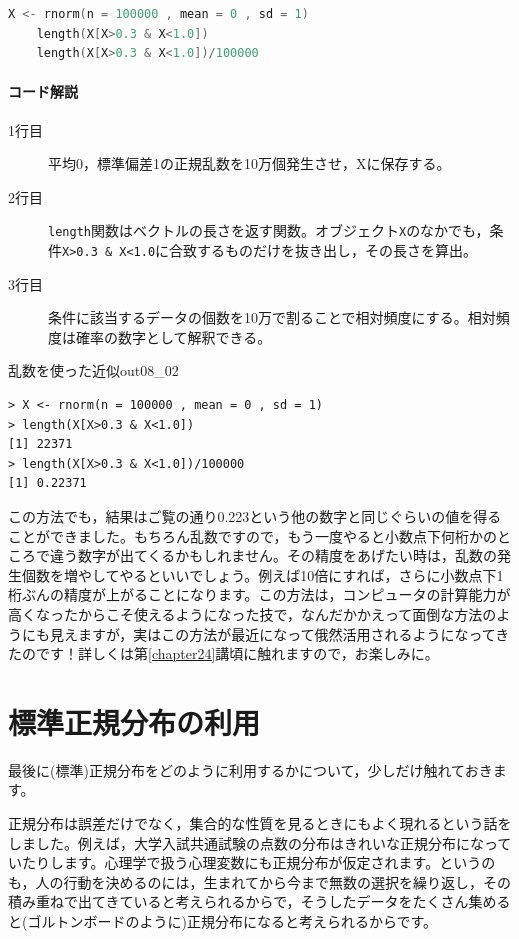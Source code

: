 \documentclass{ltjbook}
\begin{document}
\begin{lstlisting}[language=c++,label={code::08_02},caption={乱数を使った近似}]
    X <- rnorm(n = 100000 , mean = 0 , sd = 1)
    length(X[X>0.3 & X<1.0])
    length(X[X>0.3 & X<1.0])/100000
\end{lstlisting}
\paragraph{コード解説}
\begin{description}
    \item[1行目] 平均0，標準偏差1の正規乱数を10万個発生させ，Xに保存する。
    \item[2行目] \texttt{length}関数はベクトルの長さを返す関数。オブジェクト\texttt{X}のなかでも，条件\verb|X>0.3 & X<1.0|に合致するものだけを抜き出し，その長さを算出。
    \item[3行目] 条件に該当するデータの個数を10万で割ることで相対頻度にする。相対頻度は確率の数字として解釈できる。
\end{description}

\begin{Rscreen}{乱数を使った近似}{out08_02}
\begin{verbatim}
> X <- rnorm(n = 100000 , mean = 0 , sd = 1)
> length(X[X>0.3 & X<1.0])
[1] 22371
> length(X[X>0.3 & X<1.0])/100000
[1] 0.22371
\end{verbatim}
\end{Rscreen}
この方法でも，結果はご覧の通り0.223という他の数字と同じぐらいの値を得ることができました。もちろん乱数ですので，もう一度やると小数点下何桁かのところで違う数字が出てくるかもしれません。その精度をあげたい時は，乱数の発生個数を増やしてやるといいでしょう。例えば10倍にすれば，さらに小数点下1桁ぶんの精度が上がることになります。この方法は，コンピュータの計算能力が高くなったからこそ使えるようになった技で，なんだかかえって面倒な方法のようにも見えますが，実はこの方法が最近になって俄然活用されるようになってきたのです！詳しくは第\ref{chapter24}講頃に触れますので，お楽しみに。

\section{標準正規分布の利用}
最後に(標準)正規分布をどのように利用するかについて，少しだけ触れておきます。

正規分布は誤差だけでなく，集合的な性質を見るときにもよく現れるという話をしました。例えば，大学入試共通試験の点数の分布はきれいな正規分布になっていたりします。心理学で扱う心理変数にも正規分布が仮定されます。というのも，人の行動を決めるのには，生まれてから今まで無数の選択を繰り返し，その積み重ねで出てきていると考えられるからで，そうしたデータをたくさん集めると(ゴルトンボードのように)正規分布になると考えられるからです。
\end{document}
